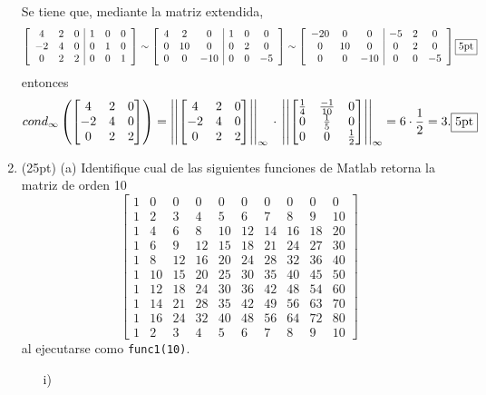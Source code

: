\documentclass[11pt]{article}
\begin{document}
\begin{enumerate}
Se tiene que, mediante la matriz extendida, 
$$
\left[
\begin{array}{ccc | ccc}
4 & 2 & 0 	& 1 & 0 & 0	\\
-2 & 4 & 0	& 0 & 1 & 0	\\
0 & 2 & 2 	& 0 & 0 & 1
\end{array}
\right]
\sim
\left[
\begin{array}{ccc | ccc}
4 & 2 & 0 	& 1 & 0 & 0	\\
0 & 10 & 0	& 0 & 2 & 0	\\
0 & 0 & -10 & 0 & 0 & -5
\end{array}
\right]
\sim
\left[
\begin{array}{ccc | ccc}
-20 & 0& 0 	& -5 & 2 & 0	\\
0 & 10 & 0	& 0 & 2 & 0	\\
0 & 0 & -10 & 0 & 0 & -5
\end{array}
\right] \fbox{5pt}
$$
entonces
$$
cond_\infty \left(
\begin{bmatrix}
4 & 2 & 0 	\\
-2 & 4 & 0 	\\
0 & 2 & 2 
\end{bmatrix}
\right)
= \left|\left|
\begin{bmatrix}
4 & 2 & 0 	\\
-2 & 4 & 0 	\\
0 & 2 & 2 
\end{bmatrix}
\right|\right|_\infty
\,\cdot\,
\left|\left|
\begin{bmatrix}
\frac{1}{4} & \frac{-1}{10} & 0 	\\
0 & \frac{1}{5} & 0 	\\
0 & 0 & \frac{1}{2} 
\end{bmatrix}
\right|\right|_\infty
=6 \cdot\frac{1}{2}=3. \fbox{5pt}
$$

\item
 (25pt) 
	(a) Identifique cual de las siguientes funciones de Matlab retorna la matriz de orden 10
    $$
    \begin{bmatrix}
1 & 0 & 0 & 0 & 0 & 0 & 0 & 0 & 0 & 0  \\1 & 2 & 3 & 4 & 5 & 6 & 7 & 8 & 9 & 10  \\1 & 4 & 6 & 8 & 10 & 12 & 14 & 16 & 18 & 20  \\1 & 6 & 9 & 12 & 15 & 18 & 21 & 24 & 27 & 30  \\1 & 8 & 12 & 16 & 20 & 24 & 28 & 32 & 36 & 40  \\1 & 10 & 15 & 20 & 25 & 30 & 35 & 40 & 45 & 50  \\1 & 12 & 18 & 24 & 30 & 36 & 42 & 48 & 54 & 60  \\1 & 14 & 21 & 28 & 35 & 42 & 49 & 56 & 63 & 70  \\1 & 16 & 24 & 32 & 40 & 48 & 56 & 64 & 72 & 80  \\1 & 2 & 3 & 4 & 5 & 6 & 7 & 8 & 9 & 10  
    \end{bmatrix}
    $$
    al ejecutarse como \texttt{func1(10)}.
    \begin{multicols}{2}
    \begin{enumerate}
    \item[i)]
    

\end{enumerate}
\end{multicols}
\end{enumerate}
\end{document}
